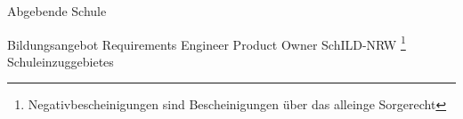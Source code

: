 Abgebende Schule

Bildungsangebot
Requirements Engineer
Product Owner
SchILD-NRW
\footnote{Negativbescheinigungen sind Bescheinigungen über das alleinge Sorgerecht}
Schuleinzuggebietes